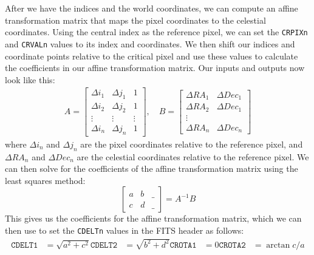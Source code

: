 After we have the indices and the world coordinates, we can compute an affine transformation matrix that maps the pixel coordinates to the celestial coordinates.
Using the central index as the reference pixel, we can set the \texttt{CRPIXn} and \texttt{CRVALn} values to its index and coordinates.
We then shift our indices and coordinate points relative to the critical pixel and use these values to calculate the coefficients in our affine transformation matrix.
Our inputs and outputs now look like this:
\begin{align}
    A = \begin{bmatrix}
        \Delta i_1 & \Delta j_1 & 1 \\
        \Delta i_2 & \Delta j_2 & 1 \\
        \vdots & \vdots & \vdots \\
        \Delta i_n & \Delta j_n & 1
    \end{bmatrix}, \quad
    B = \begin{bmatrix}
        \Delta RA_1 & \Delta Dec_1\\
        \Delta RA_2 & \Delta Dec_1\\
        \vdots \\
        \Delta RA_n & \Delta Dec_n
    \end{bmatrix}
\end{align}
where $\Delta i_n$ and $\Delta j_n$ are the pixel coordinates relative to the reference pixel, and $\Delta RA_n$ and $\Delta Dec_n$ are the celestial coordinates relative to the reference pixel.
We can then solve for the coefficients of the affine transformation matrix using the least squares method:
\begin{equation}
    \begin{bmatrix}
        a & b & \_ \\
        c & d & \_
    \end{bmatrix} = A^{-1}B
\end{equation}
This gives us the coefficients for the affine transformation matrix, which we can then use to set the \texttt{CDELTn} values in the FITS header as follows:
\begin{align}
    \texttt{CDELT1} &= \sqrt{a^2 + c^2}
    \texttt{CDELT2} &= \sqrt{b^2 + d^2}
    \texttt{CROTA1} &= 0
    \texttt{CROTA2} &= \arctan{c/a}
\end{align}

